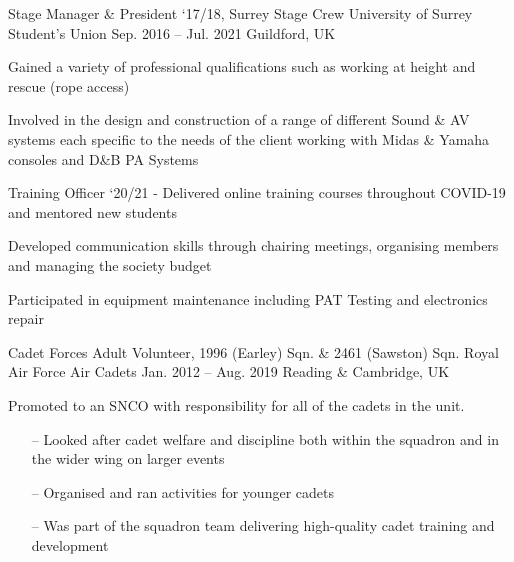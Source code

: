 

\begin{cventries}

    \cventry
      {Stage Manager \& President `17/18, Surrey Stage Crew} %
      {University of Surrey Student's Union} %
      {Sep. 2016 -- Jul. 2021} %
      {Guildford, UK} %
      {
        \begin{cvitems} %
          \item Gained a variety of professional qualifications such as working at height and rescue (rope access)
          \item Involved in the design and construction of a range of different Sound \& AV systems each specific to the needs of the client working with Midas \& Yamaha consoles and D\&B PA Systems
          \item Training Officer `20/21 - Delivered online training courses throughout COVID-19 and mentored new students
          \item Developed communication skills through chairing meetings, organising members and managing the society budget
          \item Participated in equipment maintenance including PAT Testing and electronics repair
        \end{cvitems}
      }

    \cventry
      {Cadet Forces Adult Volunteer, 1996 (Earley) Sqn. \& 2461 (Sawston) Sqn.}
      {Royal Air Force Air Cadets}
      {Jan. 2012 -- Aug. 2019}
      {Reading \& Cambridge, UK}
      {
        \begin{cvitems}
          \item Promoted to an SNCO with responsibility for all of the cadets in the unit.
          \begin{itemize}
              \item[--] Looked after cadet welfare and discipline both within the squadron and in the wider wing on larger events
              \item[--] Organised and ran activities for younger cadets
              \item[--] Was part of the squadron team delivering high-quality cadet training and development
          \end{itemize}
        \end{cvitems}
      }

  \end{cventries}